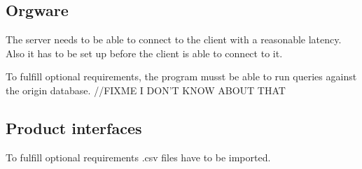 \subsection{Orgware}

The server needs to be able to connect to the client with a reasonable latency.
Also it has to be set up before the client is able to connect to it.


To fulfill optional requirements, the program musst be able to run queries against
the origin database. //FIXME I DON'T KNOW ABOUT THAT

\subsection{Product interfaces}

To fulfill optional requirements .csv files have to be imported.